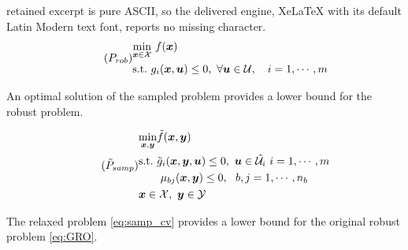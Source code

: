 \documentclass[10pt,a4paper]{amsart}
\begin{document}
retained excerpt is pure ASCII, so the delivered engine, XeLaTeX with its default Latin Modern text font, reports no missing character.
\begin{equation}\tag{$P_{rob}$}\label{eq:GRO}
\begin{aligned}
&\underset{\bm x\in \mathcal{X}}{\min}~f(\bm x)\\
&\text{s.t.}~ g_i(\bm x,\bm u)\leq 0,~\forall \bm u \in \mathcal{U},\quad i=1,\cdots,m
\end{aligned}
\end{equation}

\begin{proposition}\label{pr:bound}
An optimal solution of the sampled problem provides a lower bound for the robust problem.
\end{proposition}

\begin{equation}\tag{$\tilde{P}_{samp}$}\label{eq:samp_cv}
\begin{aligned}
&\underset{\bm x, \bm y}{\min}\tilde{f}(\bm x, \bm y)\\
&\text{s.t.}~ \tilde{g}_i(\bm x,\bm y,\bm u)\leq 0 ,~ \bm u \in \hat{\mathcal{U}_i} ~i=1,\cdots,m\\
& \qquad \mu_{bj}(\bm x,\bm y)\leq 0,  ~ ~b,j=1,\cdots, n_b\\
&\bm x \in \mathcal{X}, ~\bm y \in \mathcal{Y}
\end{aligned}
\end{equation}

\begin{proposition}
    The relaxed problem \eqref{eq:samp_cv} provides a lower bound for the original robust problem \eqref{eq:GRO}.
\end{proposition}
\end{document}
